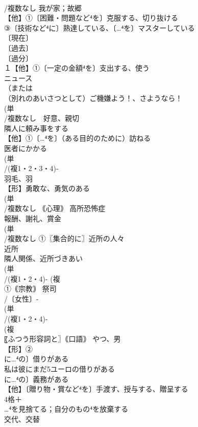 \documentclass[8pt]{extreport}
\begin{document}
\begin{CJK}{UTF8}{min}
\\	/複数なし 我が家；故郷 
\\	【他】①〔困難・問題など⁴を〕克服する、切り抜ける 
\\	③〔技術など⁴に〕熟達している、〔…⁴を〕マスターしている
\\	〔現在〕
\\	〔過去〕
\\	〔過分〕
\\	１【他】①〔一定の金額⁴を〕支出する、使う 
\\	ニュース 
\\	（または
\\	（別れのあいさつとして）ご機嫌よう！、さようなら！
\\	(単
\\	/複数なし　好意、親切 
\\	隣人に頼み事をする
\\	【他】①〔…⁴を〕（ある目的のために）訪ねる 
\\	医者にかかる
\\	(単
\\	/(複1・2・3・4)‐
\\	羽毛、羽 
\\	【形】勇敢な、勇気のある 
\\	(単
\\	/複数なし ｟心理｠ 高所恐怖症 
\\	報酬、謝礼、賞金 
\\	(単
\\	/複数なし ①〖集合的に〗近所の人々 
\\	近所 
\\	隣人関係、近所づきあい
\\	(単
\\	/(複1・2・4)- (複
\\	①｟宗教｠ 祭司 
\\	/〔女性〕-
\\	(単
\\	/(複1・2・4)-
\\	(複
\\	〖ふつう形容詞と〗｟口語｠ やつ、男 
\\	【形】②
\\	に…⁴の〕借りがある 
\\	私は彼にまだ5ユーロの借りがある 
\\	に…⁴の〕義務がある
\\	【他】〔贈り物・賞など⁴を〕手渡す、授与する、贈呈する 
\\	4格＋
\\	…⁴を見捨てる；自分のもの⁴を放棄する
\\	交代、交替 

\end{CJK}
\end{document}
